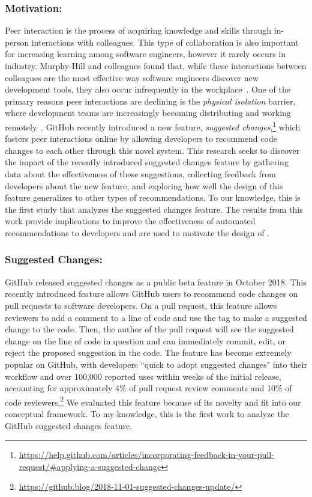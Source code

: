 \subsubsection{Motivation:} Peer interaction is the process of acquiring knowledge and skills through in-person interactions with colleagues. This type of collaboration is also important for increasing learning among software engineers, however it rarely occurs in industry. Murphy-Hill and colleagues found that, while these interactions between colleagues are the most effective way software engineers discover new development tools, they also occur infrequently in the workplace~\cite{Murphy-Hill2011PeerInteraction}. One of the primary reasons peer interactions are declining is the \textit{physical isolation} barrier, where development teams are increasingly becoming distributing and working remotely~\cite{Murphy-Hill2015HowDoUsers}. GitHub recently introduced a new feature, \textit{suggested changes},\footnote{\url{https://help.github.com/articles/incorporating-feedback-in-your-pull-request/\#applying-a-suggested-change}} which fosters peer interactions online by allowing developers to recommend code changes to each other through this novel system. This research seeks to discover the impact of the recently introduced suggested changes feature by gathering data about the effectiveness of these suggestions, collecting feedback from developers about the new feature, and exploring how well the design of this feature generalizes to other types of recommendations. To our knowledge, this is the first study that analyzes the suggested changes feature. The results from this work provide implications to improve the effectiveness of automated recommendations to developers and are used to motivate the design of \TOOL.

\subsubsection{Suggested Changes:} GitHub released suggested changes as a public beta feature in October 2018. This recently introduced feature allows GitHub users to recommend code changes on pull requests to software developers. On a pull request, this feature allows reviewers to add a comment to a line of code and use the \suggtag tag to make a suggested change to the code. Then, the author of the pull request will see the suggested change on the line of code in question and can immediately commit, edit, or reject the proposed suggestion in the code. The feature has become extremely popular on GitHub, with developers ``quick to adopt suggested changes" into their workflow and over 100,000 reported uses within weeks of the initial release, accounting for approximately 4\% of pull request review comments and 10\% of code reviewers.\footnote{\label{SuggestBlog}\url{https://github.blog/2018-11-01-suggested-changes-update/}} We evaluated this feature because of its novelty and fit into our conceptual framework. To my knowledge, this is the first work to analyze the GitHub suggested changes feature.


